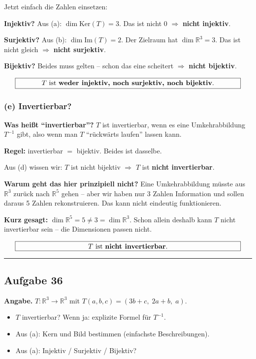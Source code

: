 \documentclass[a4paper,12pt]{article}
\begin{document}
Jetzt einfach die Zahlen einsetzen:

\textbf{Injektiv?} Aus (a): $\dim \text{Ker}(T) = 3$. Das ist nicht $0$ $\Rightarrow$ \textbf{nicht injektiv}.

\textbf{Surjektiv?} Aus (b): $\dim \text{Im}(T) = 2$. Der Zielraum hat $\dim \mathbb{R}^3 = 3$. Das ist nicht gleich $\Rightarrow$ \textbf{nicht surjektiv}.

\textbf{Bijektiv?} Beides muss gelten -- schon das eine scheitert $\Rightarrow$ \textbf{nicht bijektiv}.

\[
\fbox{\parbox{0.93\textwidth}{\centering
$T$ ist \textbf{weder injektiv, noch surjektiv, noch bijektiv}.
}}
\]

\subsubsection*{(e) Invertierbar?}

\textbf{Was hei\ss t ``invertierbar''?} $T$ ist invertierbar, wenn es eine Umkehrabbildung $T^{-1}$ gibt, also wenn man $T$ ``r\"uckw\"arts laufen'' lassen kann.

\textbf{Regel:} invertierbar $=$ bijektiv. Beides ist dasselbe.

Aus (d) wissen wir: $T$ ist nicht bijektiv $\Rightarrow$ $T$ ist \textbf{nicht invertierbar}.

\medskip

\textbf{Warum geht das hier prinzipiell nicht?} Eine Umkehrabbildung m\"usste aus $\mathbb{R}^3$ zur\"uck nach $\mathbb{R}^5$ gehen -- aber wir haben nur 3 Zahlen Information und sollen daraus 5 Zahlen rekonstruieren. Das kann nicht eindeutig funktionieren.

\textbf{Kurz gesagt:} $\dim \mathbb{R}^5 = 5 \neq 3 = \dim \mathbb{R}^3$. Schon allein deshalb kann $T$ nicht invertierbar sein -- die Dimensionen passen nicht.

\[
\fbox{\parbox{0.93\textwidth}{\centering
$T$ ist \textbf{nicht invertierbar}.
}}
\]

\bigskip
\hrule
\bigskip

\subsection*{Aufgabe 36}

\textbf{Angabe.} $T \colon \mathbb{R}^3 \to \mathbb{R}^3$ mit $T(a, b, c) = (3b + c,\; 2a + b,\; a)$.
\begin{itemize}[nosep]
\item[(a)] $T$ invertierbar? Wenn ja: explizite Formel f\"ur $T^{-1}$.
\item[(b)] Aus (a): Kern und Bild bestimmen (einfachste Beschreibungen).
\item[(c)] Aus (a): Injektiv / Surjektiv / Bijektiv?
\end{itemize}
\end{document}
